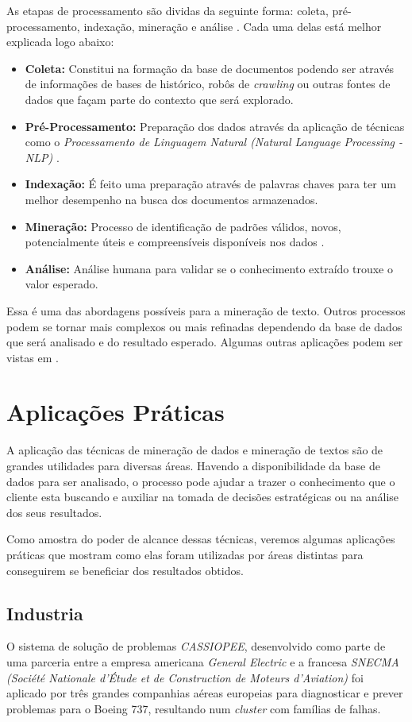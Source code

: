 \documentclass[conference]{IEEEtran}
\begin{document}
As etapas de processamento são dividas da seguinte forma: coleta, pré-processamento, indexação, mineração e análise \cite{art1}. Cada uma delas está melhor explicada logo abaixo:
\begin{itemize}
    \item \textbf{Coleta:} 
    Constitui na formação da base de documentos podendo ser através de informações de bases de histórico, robôs de \textit{crawling} ou outras fontes de dados que façam parte do contexto que será explorado.
    \item \textbf{Pré-Processamento:} Preparação dos dados através da aplicação de técnicas como o \textit{Processamento de Linguagem Natural (Natural Language Processing - NLP)} \cite{art10}.
    \item \textbf{Indexação:} É feito uma preparação através de palavras chaves para ter um melhor desempenho na busca dos documentos armazenados.
    \item \textbf{Mineração:} Processo de identificação de
    padrões válidos, novos, potencialmente úteis e compreensíveis disponíveis nos dados \cite{art9}. 
    \item \textbf{Análise:} Análise humana para validar se o conhecimento extraído trouxe o valor esperado.
\end{itemize} 

Essa é uma das abordagens possíveis para a mineração de texto. Outros processos podem se tornar mais complexos ou mais refinadas dependendo da base de dados que será analisado e do resultado esperado. Algumas outras aplicações podem ser vistas em \cite{art2,art9,art10}.

\section{Aplicações Práticas}\label{aplicacoes}

A aplicação das técnicas de mineração de dados e mineração de textos são de grandes utilidades para diversas áreas. Havendo a disponibilidade da base de dados para ser analisado, o processo pode ajudar a trazer o conhecimento que o cliente esta buscando e auxiliar na tomada de decisões estratégicas ou na análise dos seus resultados.

Como amostra do poder de alcance dessas técnicas, veremos algumas aplicações práticas que mostram como elas foram utilizadas por áreas distintas para conseguirem se beneficiar dos resultados obtidos.


\subsection{Industria}
O sistema de solução de problemas \textit{CASSIOPEE}, desenvolvido como parte de uma parceria entre a empresa americana \textit{General Electric} e a francesa \textit{SNECMA (Société Nationale d'Étude et de Construction de Moteurs d'Aviation)} foi aplicado por três grandes companhias aéreas europeias para diagnosticar e prever problemas para o Boeing 737, resultando num \textit{cluster} com famílias de falhas.
\end{document}
